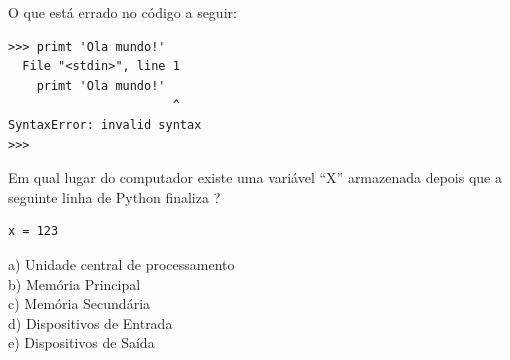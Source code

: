 \begin{ex}
O que está errado no código a seguir:

\beforeverb
\begin{verbatim}
>>> primt 'Ola mundo!'
  File "<stdin>", line 1
    primt 'Ola mundo!'
                       ^
SyntaxError: invalid syntax
>>>
\end{verbatim}
\afterverb

\end{ex}
%
%
%

\begin{ex}
Em qual lugar do computador existe uma variável ``X'' armazenada
depois que a seguinte linha de Python finaliza ?

\beforeverb
\begin{verbatim}
x = 123
\end{verbatim}
\afterverb
%
a) Unidade central de processamento\\
b) Memória Principal\\
c) Memória Secundária\\
d) Dispositivos de Entrada\\
e) Dispositivos de Saída
\end{ex}
%
%


